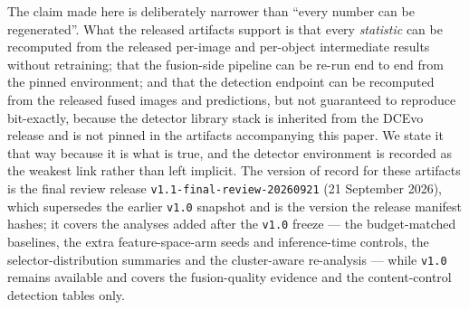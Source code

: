 \documentclass[pdflatex,sn-mathphys-num]{sn-jnl}
\theoremstyle{thmstyleone}%
\theoremstyle{thmstyletwo}%
\theoremstyle{thmstylethree}%
\begin{document}
The claim made here is deliberately narrower than ``every number can be regenerated''. What the released artifacts support is that every \emph{statistic} can be recomputed from the released per-image and per-object intermediate results without retraining; that the fusion-side pipeline can be re-run end to end from the pinned environment; and that the detection endpoint can be recomputed from the released fused images and predictions, but not guaranteed to reproduce bit-exactly, because the detector library stack is inherited from the DCEvo release and is not pinned in the artifacts accompanying this paper. We state it that way because it is what is true, and the detector environment is recorded as the weakest link rather than left implicit. The version of record for these artifacts is the final review release \texttt{v1.1-final-review-20260921} (21 September 2026), which supersedes the earlier \texttt{v1.0} snapshot and is the version the release manifest hashes; it covers the analyses added after the \texttt{v1.0} freeze --- the budget-matched baselines, the extra feature-space-arm seeds and inference-time controls, the selector-distribution summaries and the cluster-aware re-analysis --- while \texttt{v1.0} remains available and covers the fusion-quality evidence and the content-control detection tables only.
\end{document}
